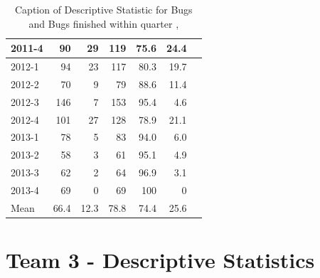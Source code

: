 \documentclass[UKenglish]{ifimaster}  %
\begin{document}
\begin{appendices}
\begin{table}[!htbp]
\begin{adjustwidth}{-2.5cm}{}
{{\begin{tabular}{ | l | r | r | r | r | r | r | }
2011-4 & 90 & 29 & 119 & 75.6 & 24.4 \\ \hline
2012-1 & 94 & 23 & 117 & 80.3 & 19.7 \\ \hline
2012-2 & 70 & 9 & 79 & 88.6 & 11.4\\ \hline
2012-3 & 146 & 7 & 153 & 95.4 & 4.6\\ \hline
2012-4 & 101 & 27 & 128 & 78.9& 21.1 \\ \hline
2013-1 & 78 & 5 & 83 & 94.0 & 6.0 \\ \hline
2013-2 & 58 & 3 & 61 & 95.1 & 4.9 \\ \hline
2013-3 & 62 & 2 & 64 & 96.9 & 3.1 \\ \hline
2013-4 & 69 & 0 & 69 & 100 & 0 \\ \hline
Mean & 66.4&12.3&78.8&74.4&25.6 \\ \hline

\end{tabular}
}
}
\end{adjustwidth}
\caption[Optional caption for list of figures]{Caption of Descriptive Statistic for Bugs and Bugs finished within quarter  , }
\label{DS:2:5} %
\end{table}
 



 \section{Team 3 - Descriptive Statistics}
 

\end{appendices}
\end{document}
